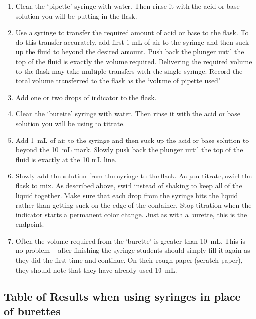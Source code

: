 \begin{enumerate}

\item{Clean the ‘pipette’ syringe with water. Then rinse it with the acid or base solution you will be putting in the flask.}

\item{Use a syringe to transfer the required amount of acid or base to the flask. To do this transfer accurately, add first 1 mL of air to the syringe and then suck up the fluid to beyond the desired amount. Push back the plunger until the top of the fluid is exactly the volume required. 
Delivering the required volume to the flask may take multiple transfers with the single syringe. Record the total volume transferred to the flask as the ‘volume of pipette used’}

\item{Add one or two drops of indicator to the flask.}

\item{Clean the ‘burette’ syringe with water. Then rinse it with the acid or base solution you will be using to titrate.}

\item{Add 1~mL of air to the syringe and then suck up the acid or base solution to beyond the 10~mL mark. Slowly push back the plunger until the top of the fluid is exactly at the 10 mL line.}

\item{Slowly add the solution from the syringe to the flask. As you titrate, swirl the flask to mix. As described above, swirl instead of shaking to keep all of the liquid together. Make sure that each drop from the syringe hits the liquid rather than getting suck on the edge of the container. Stop titration when the indicator starts a permanent color change. Just as with a burette, this is the endpoint.}

\item{Often the volume required from the ‘burette’ is greater than 10~mL. This is no problem – after finishing the syringe students should simply fill it again as they did the first time and continue. On their rough paper (scratch paper), they should note that they have already used 10~mL.}

\end{enumerate}

\subsection{Table of Results when using syringes in place of burettes}

